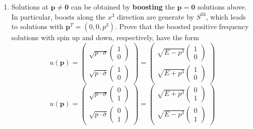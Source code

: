\documentclass[12pt]{article}
\begin{document}
\begin{enumerate}[label=(\alph*), start = 3]
    \item Solutions at $\mathbf{p}\neq\mathbf{0}$ can be obtained by \textbf{boosting} the $\mathbf{p} = \mathbf{0}$ solutions above. In particular, boosts along the $x^3$ direction are generate by $S^{03}$, which leads to solutions with $\mathbf{p}^T = (0,0,p^3)$. Prove that the boosted positive frequency solutions with spin up and down, respectively, have the form 
        \[
            u(\mathbf{p}) = 
            \begin{pmatrix}
                \sqrt{p\cdot \sigma}\begin{pmatrix}1 \\ 0\end{pmatrix} \\
                \sqrt{p\cdot \bar{\sigma}}\begin{pmatrix}1 \\ 0\end{pmatrix}
            \end{pmatrix} = 
            \begin{pmatrix}
                \sqrt{E-p^3}\begin{pmatrix}1 \\ 0\end{pmatrix} \\
                \sqrt{E+p^3}\begin{pmatrix}1 \\ 0\end{pmatrix}
            \end{pmatrix}
        \]
        \[
            u(\mathbf{p}) = 
                \begin{pmatrix}
                    \sqrt{p\cdot \sigma}\begin{pmatrix}0 \\ 1\end{pmatrix} \\
                    \sqrt{p\cdot \bar{\sigma}}\begin{pmatrix}0 \\ 1\end{pmatrix}
                \end{pmatrix} = 
                \begin{pmatrix}
                    \sqrt{E+p^3}\begin{pmatrix}0 \\ 1\end{pmatrix} \\
                    \sqrt{E-p^3}\begin{pmatrix}0 \\ 1\end{pmatrix}
                \end{pmatrix}
        \]
\end{enumerate}
\end{document}

